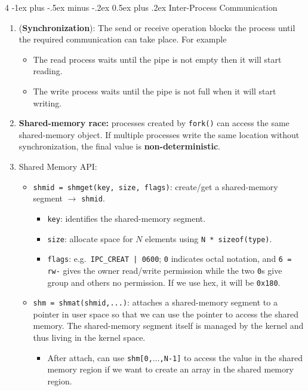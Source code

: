 \documentclass[10pt, landscape]{article}
\makeatletter
\renewcommand{\section}{\@startsection{section}{1}{0mm}%
                                {-1ex plus -.5ex minus -.2ex}%
                                {0.5ex plus .2ex}%
                                {\normalfont\large\bfseries}}
\makeatother
\begin{document}
\begin{multicols}{4}
\section{Inter-Process Communication}
\begin{enumerate}
    \item (\textbf{Synchronization}): The send or receive operation blocks the process until the required communication can take place. For example
    \begin{itemize}
        \item The read process waits until the pipe is not empty then it will start reading.
        \item The write process waits until the pipe is not full when it will start writing.
    \end{itemize}
    \item \textbf{Shared-memory race:} processes created by \texttt{fork()} can access the same shared-memory object. If multiple processes write the same location without synchronization, the final value is \textbf{non-deterministic}.
    \item Shared Memory API:
    \begin{itemize}
    \item \texttt{shmid = shmget(key, size, flags)}: create/get a shared-memory segment $\rightarrow$ \texttt{shmid}.
    \begin{itemize}
        \item \texttt{key}: identifies the shared-memory segment.
        \item \texttt{size}: allocate space for $N$ elements using \texttt{N * sizeof(type)}.
        \item \texttt{flags}: e.g.\ \texttt{IPC\_CREAT | 0600}; \texttt{0} indicates octal notation, and \texttt{6 = rw-} gives the owner read/write permission while the two \texttt{0}s give group and others no permission. If we use hex, it will be \texttt{0x180}.
    \end{itemize}
        \item \texttt{shm = shmat(shmid,...)}: attaches a shared-memory segment to a pointer in user space so that we can use the pointer to access the shared memory. The shared-memory segment itself is managed by the kernel and thus living in the kernel space.
        \begin{itemize}
            \item After attach, can use \texttt{shm[0,$\dots$,N-1]} to access the value in the shared memory region if we want to create an array in the shared memory region.

\end{itemize}
\end{itemize}
\end{enumerate}
\end{multicols}
\end{document}
